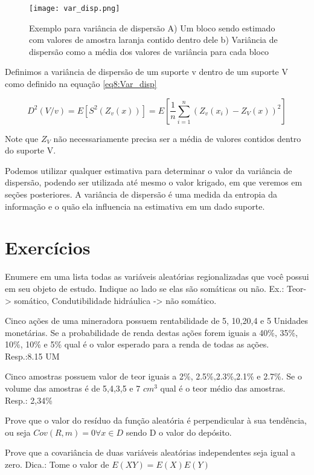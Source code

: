 \begin{figure}[H]
\centering
\texttt{[image: var\_disp.png]}
\caption{Exemplo para variância de dispersão A) Um bloco sendo estimado com valores de amostra laranja contido dentro dele b) Variância de dispersão como a média dos valores de variância para cada bloco}
\label{var_disp}
\end{figure}

Definimos a variância de dispersão de um suporte v dentro de um suporte V como definido na equação \eqref{eq8:Var_disp}

\begin{equation}\label{eq8:Var_disp}
D^{2}(V/v)=E[S^{2}(Z_{v}(x))]=E\left[\frac{1}{n}\sum_{i=1}^{n}\left(Z_{v}(x_{i})-Z_{V}(x)\right)^2\right]
\end{equation}


Note que $Z_{V}$ não necessariamente precisa ser a média de valores contidos dentro do suporte V.

Podemos utilizar qualquer estimativa para determinar o valor da variância de dispersão, podendo ser utilizada até mesmo o valor krigado, em que veremos em seções posteriores. A variância de dispersão é uma medida da entropia da informação e o quão ela influencia na estimativa em um dado suporte. 

\section{Exercícios}

\begin{exercise}
	Enumere em uma lista todas as variáveis aleatórias regionalizadas que você possui em seu objeto de estudo. Indique ao lado se elas são somáticas ou não. Ex.: Teor-> somático, Condutibilidade hidráulica -> não somático.
\end{exercise}

\begin{exercise}	
 Cinco ações de uma mineradora possuem rentabilidade de 5, 10,20,4 e 5 Unidades monetárias. Se a probabilidade de renda destas ações forem iguais a 40\%, 35\%, 10\%, 10\% e 5\% qual é o valor esperado para a renda de todas as ações. Resp.:8.15 UM
\end{exercise}

\begin{exercise}
	Cinco amostras possuem valor de teor iguais a 2\%, 2.5\%,2.3\%,2.1\% e 2.7\%. Se o volume das amostras é de 5,4,3,5 e 7 $cm^3$ qual é o teor médio das amostras. Resp.: 2,34\%
	\item Prove que o valor do resíduo da função aleatória é perpendicular à sua tendência, ou seja $Cov(R,m) = 0 \forall x \in D$ sendo D o valor do depósito.
	\item Prove que a covariância de duas variáveis aleatórias independentes seja igual a zero. Dica.: Tome o valor de $E(XY) = E(X)E(Y)$
	
\end{exercise}

 